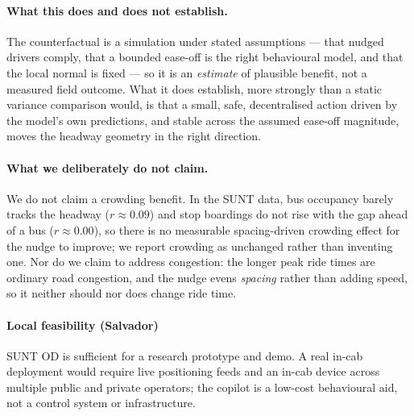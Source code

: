 \documentclass[11pt,a4paper]{article}
\begin{document}
\paragraph{What this does and does not establish.}
The counterfactual is a simulation under stated assumptions --- that nudged drivers comply, that a
bounded ease-off is the right behavioural model, and that the local normal is fixed --- so it is an
\emph{estimate} of plausible benefit, not a measured field outcome. What it does establish, more
strongly than a static variance comparison would, is that a small, safe, decentralised action driven
by the model's own predictions, and stable across the assumed ease-off magnitude, moves the headway
geometry in the right direction.

\paragraph{What we deliberately do not claim.}
We do not claim a crowding benefit. In the SUNT data, bus occupancy barely tracks the headway
($r \approx 0.09$) and stop boardings do not rise with the gap ahead of a bus ($r \approx 0.00$), so
there is no measurable spacing-driven crowding effect for the nudge to improve; we report crowding as
unchanged rather than inventing one. Nor do we claim to address congestion: the longer peak ride
times are ordinary road congestion, and the nudge evens \emph{spacing} rather than adding speed, so
it neither should nor does change ride time.

\paragraph{Local feasibility (Salvador)}
SUNT OD is sufficient for a research prototype and demo. A real in-cab deployment would require
live positioning feeds and an in-cab device across multiple public and private operators; the
copilot is a low-cost behavioural aid, not a control system or infrastructure.
\end{document}
